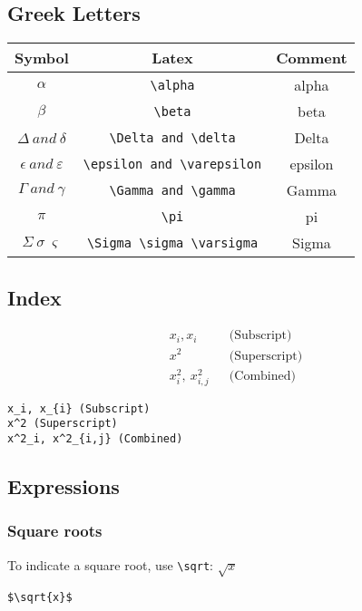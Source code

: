 \documentclass[]{article}
\begin{document}
\subsection{Greek Letters}\label{greek-letters}

\begin{longtable}[]{@{}ccc@{}}
\toprule
Symbol & Latex & Comment\tabularnewline
\midrule
\endhead
\(\alpha\) & \texttt{\textbackslash{}alpha} & alpha\tabularnewline
\(\beta\) & \texttt{\textbackslash{}beta} & beta\tabularnewline
\(\Delta~and~\delta\) &
\texttt{\textbackslash{}Delta\ and\ \textbackslash{}delta} &
Delta\tabularnewline
\(\epsilon~and~\varepsilon\) &
\texttt{\textbackslash{}epsilon\ and\ \textbackslash{}varepsilon} &
epsilon\tabularnewline
\(\Gamma~and~\gamma\) &
\texttt{\textbackslash{}Gamma\ and\ \textbackslash{}gamma} &
Gamma\tabularnewline
\(\pi\) & \texttt{\textbackslash{}pi} & pi\tabularnewline
\(\Sigma~\sigma~\varsigma\) &
\texttt{\textbackslash{}Sigma\ \textbackslash{}sigma\ \textbackslash{}varsigma}
& Sigma\tabularnewline
\bottomrule
\end{longtable}

\subsection{Index}\label{index}

\[
\begin{align}
x_i, x_{i} && \text{(Subscript)}\\
x^2 && \text{(Superscript)}\\
x^2_i,~x^2_{i,j} && \text{(Combined)}\  
\end{align}
\]

\begin{verbatim}
x_i, x_{i} (Subscript)
x^2 (Superscript)
x^2_i, x^2_{i,j} (Combined)  
\end{verbatim}

\subsection{Expressions}\label{expressions}

\subsubsection{Square roots}\label{square-roots}

To indicate a square root, use \texttt{\textbackslash{}sqrt}:
\(\sqrt{x}\)

\begin{verbatim}
$\sqrt{x}$
\end{verbatim}
\end{document}
